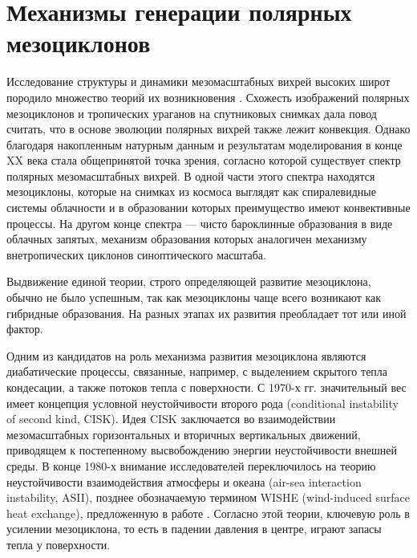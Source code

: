 %
%
%
%
\chapter{Механизмы генерации полярных мезоциклонов}
\label{sec:theory:intro}
Исследование структуры и динамики мезомасштабных вихрей высоких широт породило множество теорий их возникновения \citep{RT2003}. Схожесть изображений полярных мезоциклонов и тропических ураганов на спутниковых снимках дала повод считать, что в основе эволюции полярных вихрей также лежит конвекция. Однако благодаря накопленным натурным данным и результатам моделирования в конце XX века стала общепринятой точка зрения, согласно которой существует спектр полярных мезомасштабных вихрей. В одной части этого спектра находятся мезоциклоны, которые на снимках из космоса выглядят как спиралевидные системы облачности и в образовании которых преимущество имеют конвективные процессы. На другом конце спектра --- чисто бароклинные образования в виде облачных запятых, механизм образования которых аналогичен механизму внетропических циклонов синоптического масштаба.

Выдвижение единой теории, строго определяющей развитие мезоциклона, обычно не было успешным, так как мезоциклоны чаще всего возникают как гибридные образования. На разных этапах их развития преобладает тот или иной фактор.

Одним из кандидатов на роль механизма развития мезоциклона являются диабатические процессы, связанные, например, с выделением скрытого тепла кондесации, а также потоков тепла с поверхности. С 1970-х гг. значительный вес имеет концепция условной неустойчивости второго рода (conditional instability of second kind, CISK). Идея CISK заключается во взаимодействии мезомасштабных горизонтальных и вторичных вертикальных движений, приводящем к постепенному высвобождению энергии неустойчивости внешней среды. В конце 1980-х внимание исследователей переключилось на теорию неустойчивости взаимодействия атмосферы и океана (air-sea interaction instability, ASII), позднее обозначаемую термином WISHE (wind-induced surface heat exchange), предложенную в работе \citep{EmanuelRotunno1989}. Согласно этой теории, ключевую роль в усилении мезоциклона, то есть в падении давления в центре, играют запасы тепла у поверхности.

